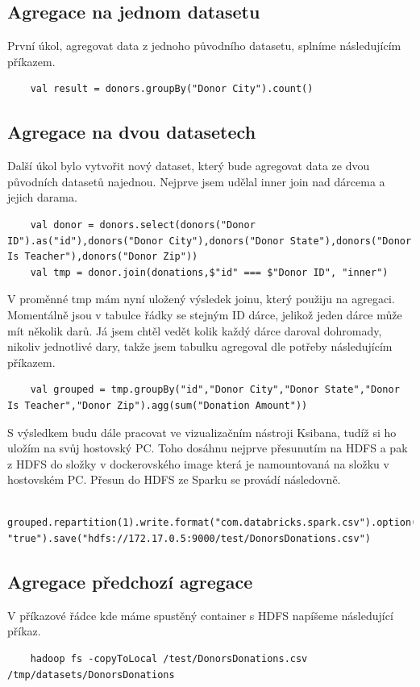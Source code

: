 \documentclass[12pt,a4paper]{article}
\begin{document}
\subsection{Agregace na jednom datasetu}
První úkol, agregovat data z jednoho původního datasetu, splníme následujícím příkazem.
\begin{lstlisting}
    val result = donors.groupBy("Donor City").count()
\end{lstlisting}

\subsection{Agregace na dvou datasetech}
Další úkol bylo vytvořit nový dataset, který bude agregovat data ze dvou původních datasetů najednou. Nejprve jsem udělal inner join nad dárcema a jejich darama.
\begin{lstlisting}
    val donor = donors.select(donors("Donor ID").as("id"),donors("Donor City"),donors("Donor State"),donors("Donor Is Teacher"),donors("Donor Zip"))
    val tmp = donor.join(donations,$"id" === $"Donor ID", "inner")
\end{lstlisting}

V proměnné tmp mám nyní uložený výsledek joinu, který použiju na agregaci. Momentálně jsou v tabulce řádky se stejným ID dárce, jelikož jeden dárce může mít několik darů. Já jsem chtěl vedět kolik každý dárce daroval dohromady, nikoliv jednotlivé dary, takže jsem tabulku agregoval dle potřeby následujícím příkazem.
\begin{lstlisting}
    val grouped = tmp.groupBy("id","Donor City","Donor State","Donor Is Teacher","Donor Zip").agg(sum("Donation Amount"))
\end{lstlisting}

S výsledkem budu dále pracovat ve vizualizačním nástroji Ksibana, tudíž si ho uložím na svůj hostovský PC. Toho dosáhnu nejprve přesunutím na HDFS a pak z HDFS do složky v dockerovského image která je namountovaná na složku v hostovském PC. Přesun do HDFS ze Sparku se provádí následovně.
\begin{lstlisting}
    grouped.repartition(1).write.format("com.databricks.spark.csv").option("header", "true").save("hdfs://172.17.0.5:9000/test/DonorsDonations.csv")
\end{lstlisting}
\pagebreak

\subsection{Agregace předchozí agregace}
V příkazové řádce kde máme spustěný container s HDFS napíšeme následující příkaz.
\begin{lstlisting}
    hadoop fs -copyToLocal /test/DonorsDonations.csv /tmp/datasets/DonorsDonations
\end{lstlisting}
\end{document}
